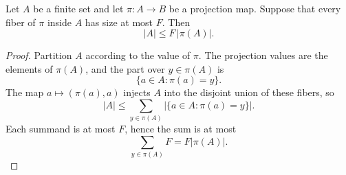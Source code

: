 \begin{helper}
Let \(A\) be a finite set and let \(\pi:A\to B\) be a projection map.  Suppose
that every fiber of \(\pi\) inside \(A\) has size at most \(F\).  Then
\[
|A|\le F\,|\pi(A)|.
\]
\end{helper}
\begin{proof}
Partition \(A\) according to the value of \(\pi\).  The projection values are
the elements of \(\pi(A)\), and the part over \(y\in\pi(A)\) is
\[
\{a\in A:\pi(a)=y\}.
\]
The map \(a\mapsto(\pi(a),a)\) injects \(A\) into the disjoint union of these
fibers, so
\[
|A|\le\sum_{y\in\pi(A)}|\{a\in A:\pi(a)=y\}|.
\]
Each summand is at most \(F\), hence the sum is at most
\[
\sum_{y\in\pi(A)}F=F|\pi(A)|.
\]
\end{proof}
